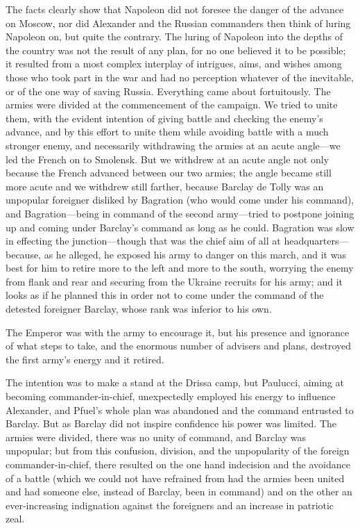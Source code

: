 The facts clearly show that Napoleon did not foresee the danger
of the advance on Moscow, nor did Alexander and the Russian
commanders then think of luring Napoleon on, but quite the
contrary. The luring of Napoleon into the depths of the country
was not the result of any plan, for no one believed it to be
possible; it resulted from a most complex interplay of intrigues,
aims, and wishes among those who took part in the war and had no
perception whatever of the inevitable, or of the one way of
saving Russia. Everything came about fortuitously. The armies
were divided at the commencement of the campaign. We tried to
unite them, with the evident intention of giving battle and
checking the enemy's advance, and by this effort to unite them
while avoiding battle with a much stronger enemy, and necessarily
withdrawing the armies at an acute angle---we led the French on
to Smolensk. But we withdrew at an acute angle not only because
the French advanced between our two armies; the angle became
still more acute and we withdrew still farther, because Barclay
de Tolly was an unpopular foreigner disliked by Bagration (who
would come under his command), and Bagration---being in command
of the second army---tried to postpone joining up and coming
under Barclay's command as long as he could. Bagration was slow
in effecting the junction---though that was the chief aim of all
at headquarters---because, as he alleged, he exposed his army to
danger on this march, and it was best for him to retire more to
the left and more to the south, worrying the enemy from flank and
rear and securing from the Ukraine recruits for his army; and it
looks as if he planned this in order not to come under the
command of the detested foreigner Barclay, whose rank was
inferior to his own.

The Emperor was with the army to encourage it, but his presence
and ignorance of what steps to take, and the enormous number of
advisers and plans, destroyed the first army's energy and it
retired.

The intention was to make a stand at the Drissa camp, but
Paulucci, aiming at becoming commander-in-chief, unexpectedly
employed his energy to influence Alexander, and Pfuel's whole
plan was abandoned and the command entrusted to Barclay. But as
Barclay did not inspire confidence his power was limited. The
armies were divided, there was no unity of command, and Barclay
was unpopular; but from this confusion, division, and the
unpopularity of the foreign commander-in-chief, there resulted on
the one hand indecision and the avoidance of a battle (which we
could not have refrained from had the armies been united and had
someone else, instead of Barclay, been in command) and on the
other an ever-increasing indignation against the foreigners and
an increase in patriotic zeal.


